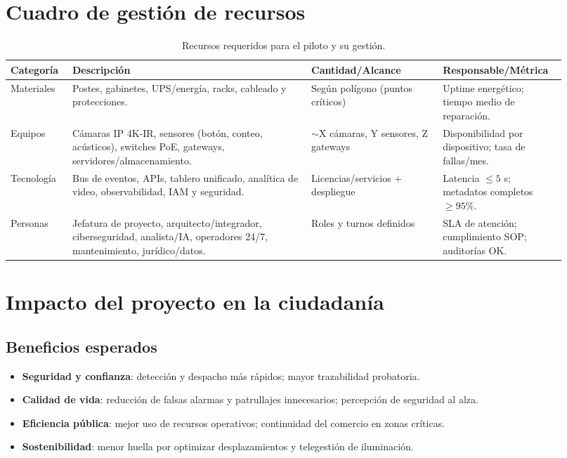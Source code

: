\documentclass[12pt,a4paper]{article}
\begin{document}
\section{Cuadro de gestión de recursos}

\begin{table}[htbp]
\centering
\caption{Recursos requeridos para el piloto y su gestión.}
\begin{tabular}{p{0.1\linewidth} p{0.40\linewidth} p{0.22\linewidth} p{0.20\linewidth}}
\hline
\textbf{Categoría} & \textbf{Descripción} & \textbf{Cantidad/Alcance} & \textbf{Responsable/Métrica} \\
\hline
Materiales & Postes, gabinetes, UPS/energía, racks, cableado y protecciones. & Según polígono (puntos críticos) & Uptime energético; tiempo medio de reparación. \\
Equipos & Cámaras IP 4K-IR, sensores (botón, conteo, acústicos), switches PoE, gateways, servidores/almacenamiento. & \(\sim\)X cámaras, Y sensores, Z gateways & Disponibilidad por dispositivo; tasa de fallas/mes. \\
Tecnología & Bus de eventos, APIs, tablero unificado, analítica de video, observabilidad, IAM y seguridad. & Licencias/servicios + despliegue & Latencia \(\leq 5\) s; metadatos completos \(\geq 95\%\). \\
Personas & Jefatura de proyecto, arquitecto/integrador, ciberseguridad, analista/IA, operadores 24/7, mantenimiento, jurídico/datos. & Roles y turnos definidos & SLA de atención; cumplimiento SOP; auditorías OK. \\
\hline
\end{tabular}
\end{table}


\section{Impacto del proyecto en la ciudadanía}

\subsection*{Beneficios esperados}
\begin{itemize}
  \item \textbf{Seguridad y confianza}: detección y despacho más rápidos; mayor trazabilidad probatoria.
  \item \textbf{Calidad de vida}: reducción de falsas alarmas y patrullajes innecesarios; percepción de seguridad al alza.
  \item \textbf{Eficiencia pública}: mejor uso de recursos operativos; continuidad del comercio en zonas críticas.
  \item \textbf{Sostenibilidad}: menor huella por optimizar desplazamientos y telegestión de iluminación.
\end{itemize}
\end{document}
